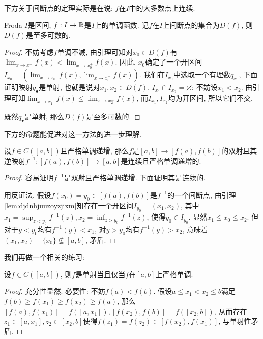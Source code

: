 下方关于间断点的定理实际是在说: $f$在$I$中的大多数点上连续. 

\begin{theorem}{Froda}
	$I$是区间, $f:I \to \mathbb{R}$是$I$上的单调函数. 记$f$在$I$上间断点的集合为$D(f)$, 则$D(f)$是至多可数的. 
\end{theorem}
\begin{proof}
	不妨考虑$f$单调不减, 由引理可知对$x_0 \in D(f)$有$\lim_{x \to x_0^-} f(x) < \lim_{x \to x_0^+} f(x)$. 因此, $x_0$确定了一个开区间$I_{x_0}=(\lim_{x \to x_0^-} f(x) , \lim_{x \to x_0^+} f(x))$. 我们在$I_{x_0}$中选取一个有理数$q_{x_0}$, 下面证明映射$q_{\bullet}$是单射, 也就是说对$x_1,x_2 \in D(f)$, $I_{x_1} \cap I_{x_2} = \varnothing$: 不妨设$x_1<x_2$. 由引理可知$\lim_{x \to x_1^+} f(x) \leq \lim_{x \to x_2^-} f(x)$, 而$I_{x_1},I_{x_2}$均为开区间, 所以它们不交. 
	
	既然$q_{\bullet}$是单射, 那么$D(f)$是至多可数的. 
\end{proof}

下方的命题能促进对这一方法的进一步理解. 

\begin{proposition}{}
	设$f \in C([a,b])$且严格单调递增, 那么$f$是$[a,b] \to [f(a),f(b)]$的双射且其逆映射$f^{-1}:[f(a),f(b)] \to [a,b]$是连续且严格单调递增的. 
\end{proposition}
\begin{proof}
	容易证明$f^{-1}$是双射且严格单调递增. 下面证明其是连续的. 
	
	用反证法. 假设$f(x_0)=y_0 \in [f(a),f(b)]$是$f^{-1}$的一个间断点, 由引理\ref{lem:djdnhjuuzoyzjixm}知存在一个开区间$I_{y_0}=(x_1,x_2)$, 其中$x_1=\sup_{z<y_0}f^{-1}(z),x_2=\inf_{z>y_0}f^{-1}(z)$, 使得$y_0 \in I_{y_0}$. 显然$x_1 \leq x_0 \leq x_2$. 但对于$y<y_0$均有$f^{-1}(y)<x_1$, 对$y>y_0$均有$f^{-1}(y)>x_2$, 意味着$(x_1,x_2)-\{ x_0 \} \nsubseteq [a,b]$, 矛盾. 
\end{proof}

我们再做一个相关的练习: 

\begin{proposition}{}
	设$f \in C([a,b])$, 则$f$是单射当且仅当$f$在$[a,b]$上严格单调. 
\end{proposition}
\begin{proof}
	充分性显然. 必要性: 不妨$f(a)<f(b)$. 假设$a \leq x_1 < x_2 \leq b$满足$f(b) \geq f(x_1) \geq f(x_2) \geq f(a)$, 那么$[f(a),f(x_1)] = f([a,x_1]), [f(x_2),f(b)] = f([x_2,b])$, 从而存在$z_1 \in [a,x_1],z_2 \in [x_2,b]$使得$f(z_1)=f(z_2) \in [f(x_2),f(x_1)]$, 与单射性矛盾. 
\end{proof}

